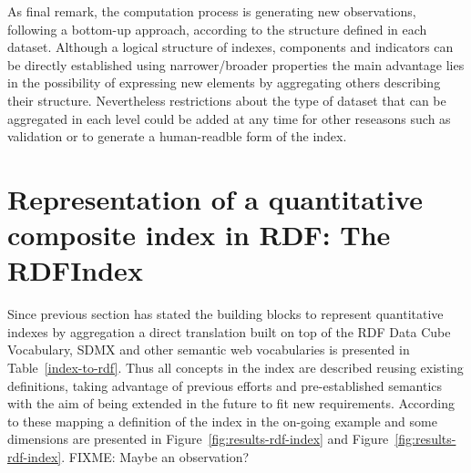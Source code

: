 As final remark, the computation process is generating new observations, following a bottom-up approach, according to the structure defined 
in each dataset. Although a logical structure of indexes, components and indicators can be directly established using narrower/broader properties 
the main advantage lies in the possibility of expressing new elements by aggregating others describing their structure. Nevertheless restrictions 
about the type of dataset that can be aggregated in each level could be added at any time for other reseasons such as validation or to generate 
a human-readble form of the index.


\section{Representation of a quantitative composite index in RDF: The RDFIndex}
Since previous section has stated the building blocks to represent quantitative indexes by aggregation a direct translation built 
on top of the RDF Data Cube Vocabulary, SDMX and other semantic web vocabularies is presented in Table~\ref{index-to-rdf}. Thus 
all concepts in the index are described reusing existing definitions, taking advantage of previous efforts and pre-established semantics 
with the aim of being extended in the future to fit new requirements. According to these mapping a definition of the index in the 
on-going example and some dimensions are presented in Figure~\ref{fig:results-rdf-index} and Figure~\ref{fig:results-rdf-index}.
FIXME: Maybe an observation?

